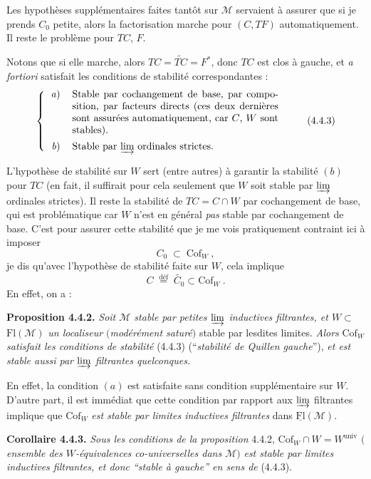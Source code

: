 \documentclass[11pt]{article}
\newcommand{\printedpage}[1]{\marginpar{\footnotesize p.~#1}}
\newcommand{\msp}[1]{\marginpar{\footnotesize [#1]}}
\newcommand{\Fl}{\mathrm{Fl}}
\newcommand{\Cof}{\mathrm{Cof}}
\newcommand{\deq}{\overset{\text{déf}}{=}}
\newcommand{\univ}{\mathrm{univ}}
\begin{document}
\msp{page 39}
Les hypothèses supplémentaires faites tantôt sur $\mathcal{M}$ servaient à assurer que si je prends $C_0$ petite, alors la factorisation marche pour $(C,TF)$ automatiquement. Il reste le problème pour $TC$, $F$.

Notons que si elle marche, alors $TC=\widetilde{TC}=F^*$, donc $TC$ est clos à gauche, et \textit{a fortiori} satisfait les conditions de stabilité correspondantes :
\[
\left\{
\begin{tabular}{rp{0.6\textwidth}}
\textit{a}) & Stable par cochangement de base, par composition, par facteurs directs (ces deux dernières sont assurées automatiquement, car $C$, $W$ sont stables).\\[1ex]
\textit{b}) & Stable par $\varinjlim$ ordinales strictes.
\end{tabular}
\right.
\tag*{(4.4.3)}
\]

L'hypothèse de stabilité sur $W$ sert (entre autres) à garantir la stabilité $(b)$ pour $TC$ (en fait, il suffirait pour cela seulement que $W$ soit stable par $\varinjlim$ ordinales strictes). Il reste la stabilité de $TC=C{\cap}W$ par cochangement de base, qui est problématique car $W$ n'est en général \textit{pas} stable par cochangement de base. C'est pour assurer cette stabilité que je me vois pratiquement contraint ici à imposer
\[
C_0\;\subset\;\Cof_W\ , \tag*{(4.4.4)}
\]
je dis qu'avec l'hypothèse de stabilité faite sur $W$, cela implique
\[
C\;\deq\;\widetilde{C_0}\subset\Cof_W\ . \tag*{(4.4.5)}
\]
\printedpage{27}
\msp{page 40}
En effet, on a :

\textbf{Proposition 4.4.2.} \textit{Soit $\mathcal{M}$ stable par petites $\varinjlim$ inductives filtrantes, et $W\subset$} $\Fl(\mathcal{M})$ \textit{un localiseur $($modérément saturé$)$} stable par lesdites limites. \textit{Alors} $\Cof_W$ \textit{satisfait les conditions de stabilité} (4.4.3) (“\textit{stabilité de Quillen gauche}”), \textit{et est stable aussi par $\varinjlim$ filtrantes quelconques.}

En effet, la condition $(a)$ est satisfaite sans condition supplémentaire sur $W$. D'autre part, il est immédiat que cette condition par rapport aux $\varinjlim$ filtrantes implique que $\Cof_W$ \textit{est stable par limites inductives filtrantes} dans $\underline{\Fl}(\mathcal{M})$.

\textbf{Corollaire 4.4.3.} \textit{Sous les conditions de la proposition} 4.4.2, $\Cof_W\cap W=W^{\univ}$ $($\textit{ensemble des $W$-équivalences co-universelles dans $\mathcal{M}$}$)$ \textit{est stable par limites inductives filtrantes, et donc “stable à gauche” en sens de} (4.4.3).
\end{document}

